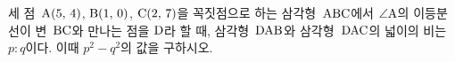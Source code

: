 세 점~$\mathrm{A}(5,\,4)$, $\mathrm{B}(1,\,0)$, $\mathrm{C}(2,\,7)$을 꼭짓점으로 하는 삼각형~$\mathrm{ABC}$에서 $\angle\mathrm{A}$의 이등분선이 변~$\mathrm{BC}$와 만나는 점을 $\mathrm{D}$라 할 때, 삼각형~$\mathrm{DAB}$와 삼각형~$\mathrm{DAC}$의 넓이의 비는 $p:q$이다. 이때 $p^2-q^2$의 값을 구하시오. 

